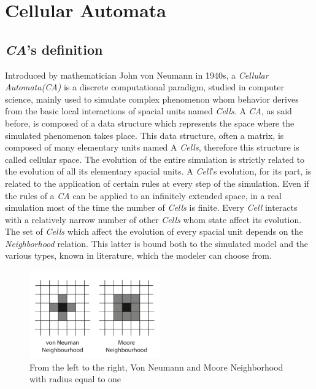\documentclass[12pt,a4paper,fleqn]{report}
\begin{document}
\chapter{Cellular Automata}
\section{\textit{CA}'s definition}
Introduced by mathematician John von Neumann in 1940s, a \textit{Cellular Automata(CA)} is a discrete computational paradigm, studied in computer science, mainly used to simulate complex phenomenon whom behavior derives from the basic local interactions of spacial units named \textit{Cells}. A \textit{CA}, as said before, is composed of a  data structure which represents the space where the simulated phenomenon takes place. This data structure, often a matrix, is composed of many elementary units named A \textit{Cells}, therefore this structure is called cellular space. The evolution of the entire simulation is strictly related to the evolution of  all its elementary spacial units. A \textit{Cell}'s evolution, for its part, is related to the application of certain rules at every step of the simulation. Even if the rules of a \textit{CA} can be applied to an infinitely extended space, in a real simulation most of the time the number of \textit{Cells} is finite. Every \textit{Cell} interacts with a relatively narrow number of other \textit{Cells} whom state affect its evolution. The set of \textit{Cells} which affect the evolution of every spacial unit depends on the \textit{Neighborhood} relation. This latter is bound both to the simulated model and the various types, known in literature, which the modeler can choose from. \\

\begin{figure}[ht!]
\centering
    \includegraphics[width=0.5\textwidth]{neigh_types}
    \caption{  From the left to the right, Von Neumann and Moore Neighborhood  with radius equal to one \cite{1} }
\end{figure}
\end{document}
